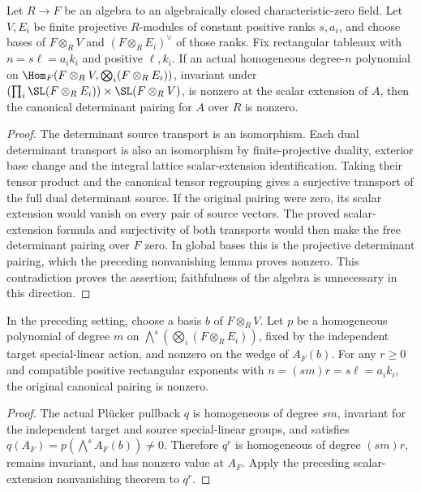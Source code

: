 \begin{lemma}
\label{lem:canonical-pairing-nonzero-descent}
\leanok
Let $R\to F$ be an algebra to an algebraically closed characteristic-zero
field. Let $V,E_i$ be finite projective $R$-modules of constant positive
ranks $s,a_i$, and choose bases of $F\otimes_R V$ and
$(F\otimes_R E_i)^\vee$ of those ranks. Fix rectangular tableaux with
$n=s\ell=a_i k_i$ and positive $\ell,k_i$.
If an actual homogeneous degree-$n$ polynomial on
$\Hom_F(F\otimes_R V,\bigotimes_i(F\otimes_R E_i))$, invariant under
$(\prod_i\SL(F\otimes_R E_i))\times\SL(F\otimes_R V)$, is nonzero at the
scalar extension of $A$, then the canonical determinant pairing for $A$
over $R$ is nonzero.
\end{lemma}
\begin{proof}
The determinant source transport is an isomorphism. Each dual determinant
transport is also an isomorphism by finite-projective duality, exterior
base change and the integral lattice scalar-extension identification.
Taking their tensor product and the canonical tensor regrouping gives a
surjective transport of the full dual determinant source. If the original
pairing were zero, its scalar extension would vanish on every pair of
source vectors. The proved scalar-extension formula and surjectivity of
both transports would then make the free determinant pairing over $F$
zero. In global bases this is the projective determinant pairing, which
the preceding nonvanishing lemma proves nonzero. This contradiction proves
the assertion; faithfulness of the algebra is unnecessary in this direction.
\end{proof}

\begin{lemma}
\label{lem:plucker-power-canonical-nonzero}
\leanok
In the preceding setting, choose a basis $b$ of $F\otimes_R V$.
Let $p$ be a homogeneous polynomial of degree $m$ on
$\bigwedge^s(\bigotimes_i(F\otimes_R E_i))$, fixed by the independent
target special-linear action, and nonzero on the wedge of $A_F(b)$.
For any $r\geq0$ and compatible positive rectangular exponents with
$n=(sm)r=s\ell=a_i k_i$, the original canonical pairing is nonzero.
\end{lemma}
\begin{proof}
The actual Pl\"ucker pullback $q$ is homogeneous of degree $sm$, invariant
for the independent target and source special-linear groups, and satisfies
$q(A_F)=p(\bigwedge^s A_F(b))\ne0$. Therefore $q^r$ is homogeneous of
degree $(sm)r$, remains invariant, and has nonzero value at $A_F$.
Apply the preceding scalar-extension nonvanishing theorem to $q^r$.
\end{proof}


